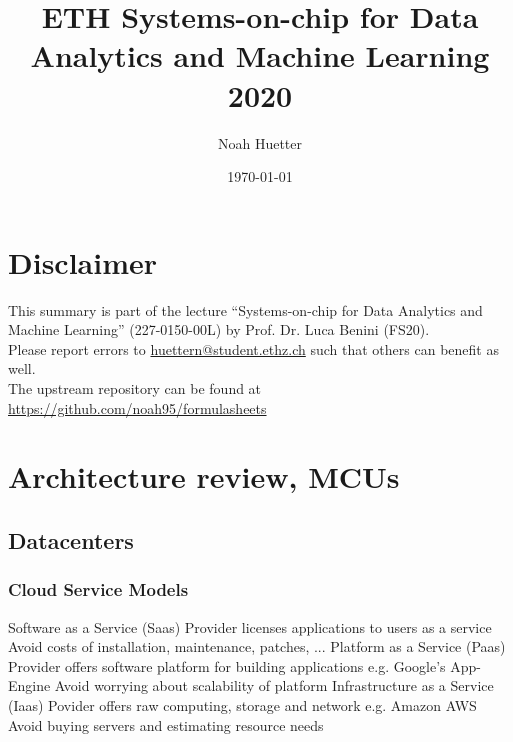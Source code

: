 \documentclass[a4paper, fontsize=8pt, landscape, DIV=1]{scrartcl}
\title{ETH Systems-on-chip for Data Analytics and Machine Learning 2020}
\author{Noah Huetter}
\date{\today}
\begin{document}
\setcounter{page}{0}
\setcounter{secnumdepth}{2} %
\begin{multicols*}{4}
	\section*{Disclaimer}
	This summary is part of the lecture ``Systems-on-chip for Data Analytics and Machine Learning'' (227-0150-00L) by Prof. Dr. Luca Benini (FS20). \\[6pt]
	Please report errors to \href{mailto:huettern@student.ethz.ch}{huettern@student.ethz.ch} such that others can benefit as well.\\[6pt]	
  The upstream repository can be found at \href{https://github.com/noah95/formulasheets}{https://github.com/noah95/formulasheets}
	\vfill\null
  \columnbreak
  \setcounter{tocdepth}{2}
  \tableofcontents
  \vfill\null
	\pagebreak
  \maketitle 
  \setcounter{page}{1}
  \thispagestyle{fancy}

  \section{Architecture review, MCUs}
  \subsection{Datacenters}
  \subsubsection{Cloud Service Models}
  \begin{outline}
    \1 Software as a Service (Saas)
      \2 Provider licenses applications to users as a service
      \2 Avoid costs of installation, maintenance, patches, ...
    \1 Platform as a Service (Paas)
      \2 Provider offers software platform for building applications
      \2 e.g. Google's App-Engine
      \2 Avoid worrying about scalability of platform
    \1 Infrastructure as a Service (Iaas)
      \2 Povider offers raw computing, storage and network
      \2 e.g. Amazon AWS
      \2 Avoid buying servers and estimating resource needs
  \end{outline}


\end{multicols*}
\end{document}

